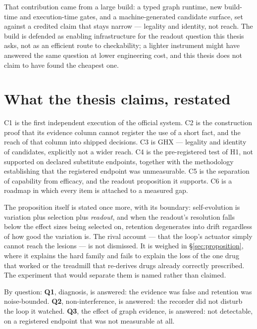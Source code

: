 That contribution came from a large build: a typed graph runtime, new
build-time and execution-time gates, and a machine-generated candidate
surface, set against a credited claim that stays narrow --- legality and
identity, not reach. The build is defended as enabling infrastructure for
the readout question this thesis asks, not as an efficient route to
checkability; a lighter instrument might have answered the same question
at lower engineering cost, and this thesis does not claim to have found
the cheapest one.

\section*{What the thesis claims, restated}

C1 is the first independent execution of the official system. C2 is the
construction proof that its evidence column cannot register the use of a
short fact, and the reach of that column into shipped decisions. C3 is GHX
--- legality and identity of candidates, explicitly not a wider reach. C4
is the pre-registered test of H1, not supported on declared substitute
endpoints, together with the methodology establishing that the registered
endpoint was unmeasurable. C5 is the separation of capability from
efficacy, and the readout proposition it supports. C6 is a roadmap in which
every item is attached to a measured gap.

The proposition itself is stated once more, with its boundary:
self-evolution is variation plus selection plus \emph{readout}, and when
the readout's resolution falls below the effect sizes being selected on,
retention degenerates into drift regardless of how good the variation is.
The rival account --- that the loop's actuator simply cannot reach the
lesions --- is not dismissed. It is weighed in \S\ref{sec:proposition},
where it explains the hard family and fails to explain the loss of the one
drug that worked or the treadmill that re-derives drugs already correctly
prescribed. The experiment that would separate them is named rather than
claimed.

By question: \textbf{Q1}, diagnosis, is answered: the evidence was false
and retention was noise-bounded. \textbf{Q2}, non-interference, is
answered: the recorder did not disturb the loop it watched. \textbf{Q3},
the effect of graph evidence, is answered: not detectable, on a
registered endpoint that was not measurable at all.

